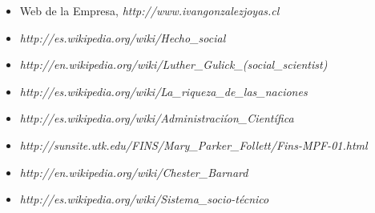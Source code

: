\begin{itemize}
	\item Web de la Empresa, \emph{http://www.ivangonzalezjoyas.cl}
	\item \emph{http://es.wikipedia.org/wiki/Hecho\_social}
	\item \emph{http://en.wikipedia.org/wiki/Luther\_Gulick\_(social\_scientist)}
	\item \emph{http://es.wikipedia.org/wiki/La\_riqueza\_de\_las\_naciones}
	\item \emph{http://es.wikipedia.org/wiki/Administraciíon\_Científica}
	\item \emph{http://sunsite.utk.edu/FINS/Mary\_Parker\_Follett/Fins-MPF-01.html}
	\item \emph{http://en.wikipedia.org/wiki/Chester\_Barnard}
	\item \emph{http://es.wikipedia.org/wiki/Sistema\_socio-técnico}
\end{itemize}
